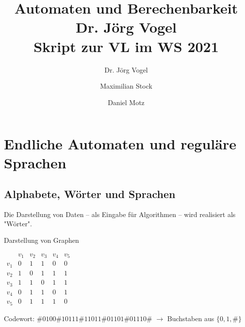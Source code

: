 \documentclass[runningheads,deutsch]{llncs}
\begin{document}
%
\title{
    Automaten und Berechenbarkeit \\
    Dr. Jörg Vogel \\
    Skript zur VL im WS 2021
}
%
%
\author{
    Dr. Jörg Vogel \and 
    Maximilian Stock \and 
    Daniel Motz
}
%
%
%
\maketitle
%
\pagebreak

\section{Endliche Automaten und reguläre Sprachen}

\subsection{Alphabete, Wörter und Sprachen}

Die Darstellung von Daten -- als Eingabe für Algorithmen -- wird realisiert als "Wörter".

\begin{example}
    Darstellung von Graphen

    \begin{minipage}{.5\textwidth}
    \end{minipage} %
    \begin{minipage}{.5\textwidth}
        $\begin{matrix}
            & v_1 & v_2 & v_3 & v_4 & v_5 \\
        v_1 & 0 & 1 & 1 & 0 & 0 \\
        v_2 & 1 & 0 & 1 & 1 & 1 \\
        v_3 & 1 & 1 & 0 & 1 & 1 \\
        v_4 & 0 & 1 & 1 & 0 & 1 \\
        v_5 & 0 & 1 & 1 & 1 & 0
        \end{matrix}$
    \end{minipage}%
    \newline%
    \newline%
    Codewort: $\#0100\#10111\#11011\#01101\#01110\#$
    $\rightarrow$ Buchstaben aus $\{0, 1, \#\}$
\end{example}
\end{document}
